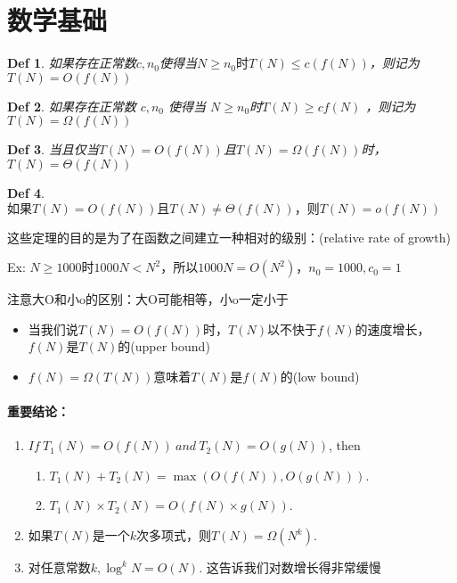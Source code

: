 \documentclass[utf8]{ctexbook}
\newtheorem{Definition}{\large\textbf Def}[chapter]
\begin{document}
\section{数学基础}
\begin{Definition}
    如果存在正常数$c,n_0$使得当$N\ge n_0时T(N) \le c(f(N))$，则记为$T(N) = O(f(N))$
\end{Definition}
\begin{Definition}
如果存在正常数 $c, n_0$ 使得当 $N\ge n_0$时$T(N) \ge cf(N)$ ，则记为 $T(N) = \Omega(f(N))$
\end{Definition}
\begin{Definition}
当且仅当$T(N) = O(f(N))$且$T(N) = \Omega (f(N))$时，$T(N) = \Theta(f(N))$
\end{Definition}
\begin{Definition}
$如果T(N) = O(f(N))且T(N) \ne \Theta (f(N))，则T(N) = o(f(N))$
\end{Definition}

这些定理的目的是为了在函数之间建立一种相对的级别：(relative rate of growth)

Ex: $N\ge 1000时1000 N < N^2，所以1000N = O(N^2)，n_0 = 1000, c_0 = 1$

注意大O和小o的区别：大O可能相等，小o一定小于

\begin{itemize}
    \item 当我们说$T(N) = O(f(N))$时，$T(N)$以不快于$f(N)$的速度增长，$f(N)$是$T(N)$的(upper bound)
    \item $f(N) = \Omega (T(N))$意味着$T(N)$是$f(N)$的(low bound)
\end{itemize}


\paragraph{重要结论：}
\begin{enumerate}
    \item $If\ T_1(N) = O(f(N))\ and\ T_2 (N) = O(g(N))$, then 
        \begin{enumerate}
            \item $T_1(N) + T_2(N) = \max (O(f(N)), O(g(N)))$.
            \item $T_1(N)\times T_2(N) = O(f(N)\times g(N))$.
        \end{enumerate}
    \item 如果$T(N)$是一个$k$次多项式，则$T(N) = \Omega (N^k)$.
    \item 对任意常数$k,\log ^kN = O(N)$. 这告诉我们对数增长得非常缓慢
\end{enumerate}
\end{document}
